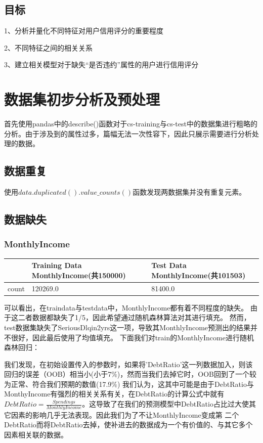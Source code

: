 \documentclass[UTF8,a4paper,10pt]{ctexart}
\begin{document}
\subsection{目标}
1、分析并量化不同特征对用户信用评分的重要程度

2、不同特征之间的相关关系

3、建立相关模型对于缺失“是否违约”属性的用户进行信用评分



\section{数据集初步分析及预处理}
首先使用pandas中的describe()函数对于cs-training与cs-test中的数据集进行粗略的分析。由于涉及到的属性过多，篇幅无法一次性容下，因此只展示需要进行分析处理的数据。
\subsection{数据重复}

使用$data.duplicated().value\_counts()$函数发现两数据集并没有重复元素。

\subsection{数据缺失}
\subsubsection{MonthlyIncome}
\begin{tabular}{|r|l|l|}
	\hline
	      & Training Data MonthlyIncome(共150000) & Test Data MonthlyIncome(共101503) \\ \hline
	count & 120269.0                              & 81400.0                           \\ \hline
\end{tabular}\newline

可以看出，在traindata与testdata中，MonthlyIncome都有着不同程度的缺失。
由于这二者数据都缺失了1/5，因此希望通过随机森林算法对其进行填充。
然而，test数据集缺失了SeriousDlqin2yrs这一项，导致其MonthlyIncome预测出的结果并不很好，因此最后使用了均值填充。
下面我们对train的MonthlyIncome进行随机森林回归：

我们发现，在初始设置传入的参数时，如果将'DebtRatio'这一列数据加入，则该回归的误差（OOB）相当小(小于7$\%$)，然而当我们去掉它时，OOB回到了一个较为正常、符合我们预期的数值(17.9$\%$)
我们认为，这其中可能是由于DebtRatio与MonthyIncome有强烈的相关关系有关，在DebtRatio的计算公式中就有$DebtRatio=\frac{Spendings}{MonthlyIncome}$。这导致了在我们的预测模型中DebtRatio占比过大使其它因素的影响几乎无法表现。因此我们为了不让MonthlyIncome变成第
二个DebtRatio而将DebtRatio去掉，使补进去的数据成为一个有价值的、与其它多个因素相关联的数据。
\end{document}
